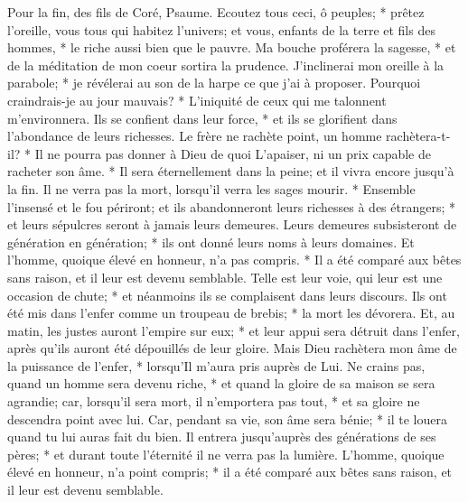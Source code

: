 Pour la fin, des fils de Coré, Psaume.
Ecoutez tous ceci, ô peuples; * prêtez l'oreille, vous tous qui habitez l'univers;
et vous, enfants de la terre et fils des hommes, * le riche aussi bien que le pauvre.
Ma bouche proférera la sagesse, * et de la méditation de mon coeur sortira la prudence.
J'inclinerai mon oreille à la parabole; * je révélerai au son de la harpe ce que j'ai à proposer.
Pourquoi craindrais-je au jour mauvais? * L'iniquité de ceux qui me talonnent m'environnera.
Ils se confient dans leur force, * et ils se glorifient dans l'abondance de leurs richesses.
Le frère ne rachète point, un homme rachètera-t-il? * Il ne pourra pas donner à Dieu de quoi L'apaiser,
ni un prix capable de racheter son âme. * Il sera éternellement dans la peine;
et il vivra encore jusqu'à la fin.
Il ne verra pas la mort, lorsqu'il verra les sages mourir. * Ensemble l'insensé et le fou périront; et ils abandonneront leurs richesses à des étrangers; *
et leurs sépulcres seront à jamais leurs demeures. Leurs demeures subsisteront de génération en génération; * ils ont donné leurs noms à leurs domaines.
Et l'homme, quoique élevé en honneur, n'a pas compris. * Il a été comparé aux bêtes sans raison, et il leur est devenu semblable.
Telle est leur voie, qui leur est une occasion de chute; * et néanmoins ils se complaisent dans leurs discours.
Ils ont été mis dans l'enfer comme un troupeau de brebis; * la mort les dévorera. Et, au matin, les justes auront l'empire sur eux; * et leur appui sera détruit dans l'enfer, après qu'ils auront été dépouillés de leur gloire.
Mais Dieu rachètera mon âme de la puissance de l'enfer, * lorsqu'Il m'aura pris auprès de Lui.
Ne crains pas, quand un homme sera devenu riche, * et quand la gloire de sa maison se sera agrandie;
car, lorsqu'il sera mort, il n'emportera pas tout, * et sa gloire ne descendra point avec lui.
Car, pendant sa vie, son âme sera bénie; * il te louera quand tu lui auras fait du bien.
Il entrera jusqu'auprès des générations de ses pères; * et durant toute l'éternité il ne verra pas la lumière.
L'homme, quoique élevé en honneur, n'a point compris; * il a été comparé aux bêtes sans raison, et il leur est devenu semblable.

